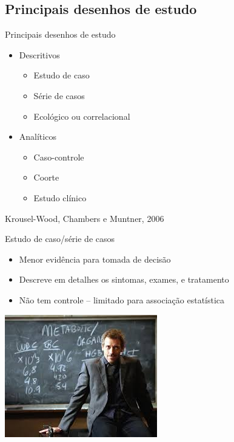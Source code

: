 \documentclass{beamer}
\begin{document}
\subsection[Desenhos]{Principais desenhos de estudo}

\begin{frame}{Principais desenhos de estudo}
  \begin{itemize}
  \item Descritivos
    \begin{itemize}
    \item Estudo de caso
    \item Série de casos
    \item Ecológico ou correlacional
    \end{itemize}
  \item Analíticos
    \begin{itemize}
    \item Caso-controle
    \item Coorte
    \item Estudo clínico
    \end{itemize}
  \end{itemize}

  \vfill
  \tiny
  \hfill Krousel-Wood, Chambers e Muntner, 2006
\end{frame}

\begin{frame}{Estudo de caso/série de casos}
  \begin{itemize}
    \small
  \item Menor evidência para tomada de decisão
    \bigskip
  \item Descreve em detalhes os sintomas, exames, e tratamento
    \bigskip
  \item Não tem controle -- limitado para associação estatística
  \end{itemize}
  \begin{center}
    \bigskip
    \bigskip
    \includegraphics[height=.4\textheight]{Metodos/house}
  \end{center}
\end{frame}
\end{document}
